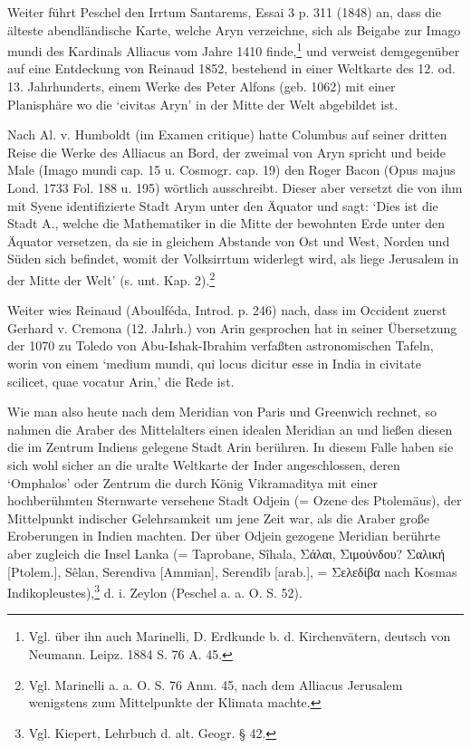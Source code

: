 \documentclass[a4paper, 11pt, oneside]{article}
\begin{document}
Weiter führt Peschel den Irrtum Santarems, Essai 3 p. 311 (1848) an, dass die älteste abendländische Karte, welche Aryn verzeichne, sich als Beigabe zur Imago mundi des Kardinals Alliacus vom Jahre 1410 finde,\footnote{Vgl. über ihn auch Marinelli, D. Erdkunde b. d. Kirchenvätern, deutsch von Neumann. Leipz. 1884 S. 76 A. 45.} und verweist demgegenüber auf eine Entdeckung von Reinaud 1852, bestehend in einer Weltkarte des 12. od. 13. Jahrhunderts, einem Werke des Peter Alfons (geb. 1062) mit einer Planisphäre wo die `civitas Aryn' in der Mitte der Welt abgebildet ist.

Nach Al. v. Humboldt (im Examen critique) hatte Columbus auf seiner dritten Reise die Werke des Alliacus an Bord, der zweimal von Aryn spricht und beide Male (Imago mundi cap. 15 u. Cosmogr. cap. 19) den Roger Bacon (Opus majus Lond. 1733 Fol. 188 u. 195) wörtlich ausschreibt. Dieser aber versetzt die von ihm mit Syene identifizierte Stadt Arym unter den Äquator und sagt: `Dies ist die Stadt A., welche die Mathematiker in die Mitte der bewohnten Erde unter den Äquator versetzen, da sie in gleichem Abstande von Ost und West, Norden und Süden sich befindet, womit der Volksirrtum widerlegt wird, als liege Jerusalem in der Mitte der Welt' (s. unt. Kap. 2).\footnote{Vgl. Marinelli a. a. O. S. 76 Anm. 45, nach dem Alliacus Jerusalem wenigstens zum Mittelpunkte der Klimata machte.}

Weiter wies Reinaud (Aboulféda, Introd. p. 246) nach, dass im Occident zuerst Gerhard v. Cremona (12. Jahrh.) von Arin gesprochen hat in seiner Übersetzung der 1070 zu Toledo von Abu-Ishak-Ibrahim verfaßten astronomischen Tafeln, worin von einem `medium mundi, qui locus dicitur esse in India in civitate scilicet, quae vocatur Arin,' die Rede ist.

Wie man also heute nach dem Meridian von Paris und Greenwich rechnet, so nahmen die Araber des Mittelalters einen idealen Meridian an und ließen diesen die im Zentrum Indiens gelegene Stadt Arin berühren. In diesem Falle haben sie sich wohl sicher an die uralte Weltkarte der Inder angeschlossen, deren `Omphalos' oder Zentrum die durch König Vikramaditya mit einer hochberühmten Sternwarte versehene Stadt Odjein (= Ozene des Ptolemäus), der Mittelpunkt indischer Gelehrsamkeit um jene Zeit war, als die Araber große Eroberungen in Indien machten. Der über Odjein gezogene Meridian berührte aber zugleich die Insel Lanka (= Taprobane, Sîhala, Σάλαι, Σιμούνδου? Σαλική [Ptolem.], Sêlan, Serendiva [Ammian], Serendîb [arab.], = Σελεδίβα nach Kosmas Indikopleustes),\footnote{Vgl. Kiepert, Lehrbuch d. alt. Geogr. § 42.} d. i. Zeylon (Peschel a. a. O. S. 52).
\end{document}
